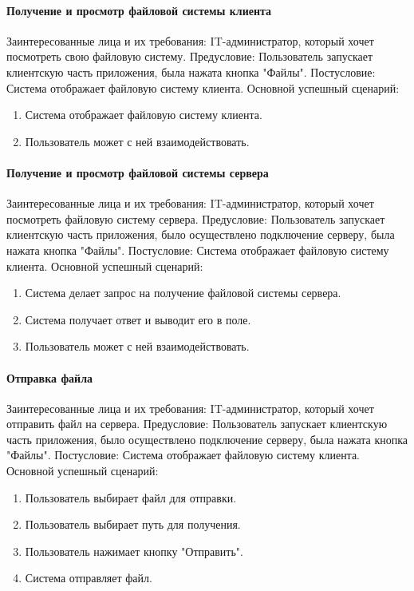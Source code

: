 \paragraph{Получение и просмотр файловой системы клиента}
Заинтересованные лица и их требования: IT-администратор, который хочет посмотреть свою файловую систему.
Предусловие: Пользователь запускает клиентскую часть приложения, была нажата кнопка "Файлы".
Постусловие: Система отображает файловую систему клиента.
Основной успешный сценарий:
\begin{enumerate}
	\item Система отображает файловую систему клиента.
	\item Пользователь может с ней взаимодействовать.
\end{enumerate}

\paragraph{Получение и просмотр файловой системы сервера}
Заинтересованные лица и их требования: IT-администратор, который хочет посмотреть файловую систему сервера.
Предусловие: Пользователь запускает клиентскую часть приложения,  было осуществлено подключение серверу, была нажата кнопка "Файлы".
Постусловие: Система отображает файловую систему клиента.
Основной успешный сценарий:
\begin{enumerate}
	\item Система делает запрос на получение файловой системы сервера.
	\item Система получает ответ и выводит его в поле.
	\item Пользователь может с ней взаимодействовать.
\end{enumerate}

\paragraph{Отправка файла}
Заинтересованные лица и их требования: IT-администратор, который хочет отправить файл на сервера.
Предусловие: Пользователь запускает клиентскую часть приложения,  было осуществлено подключение серверу, была нажата кнопка "Файлы".
Постусловие: Система отображает файловую систему клиента.
Основной успешный сценарий:
\begin{enumerate}
	\item Пользователь выбирает файл для отправки.
	\item Пользователь выбирает путь для получения.
	\item Пользователь нажимает кнопку "Отправить".
	\item Система отправляет файл.
\end{enumerate}

